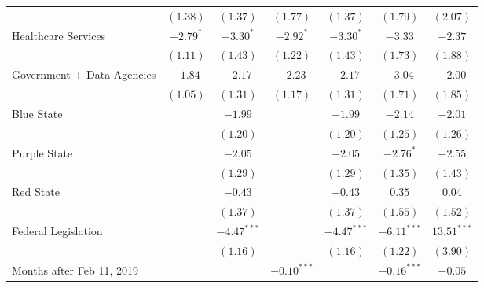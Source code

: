 \begin{table}
\begin{center}
\begin{tabular}{l c c c c c c}
                                                  & $(1.38)$     & $(1.37)$      & $(1.77)$      & $(1.37)$      & $(1.79)$      & $(2.07)$      \\
Healthcare Services                             & $-2.79^{*}$  & $-3.30^{*}$   & $-2.92^{*}$   & $-3.30^{*}$   & $-3.33$       & $-2.37$       \\
                                                  & $(1.11)$     & $(1.43)$      & $(1.22)$      & $(1.43)$      & $(1.73)$      & $(1.88)$      \\
Government + Data Agencies                      & $-1.84$      & $-2.17$       & $-2.23$       & $-2.17$       & $-3.04$       & $-2.00$       \\
                                                  & $(1.05)$     & $(1.31)$      & $(1.17)$      & $(1.31)$      & $(1.71)$      & $(1.85)$      \\
Blue State                                      &              & $-1.99$       &               & $-1.99$       & $-2.14$       & $-2.01$       \\
                                                  &              & $(1.20)$      &               & $(1.20)$      & $(1.25)$      & $(1.26)$      \\
Purple State                                    &              & $-2.05$       &               & $-2.05$       & $-2.76^{*}$   & $-2.55$       \\
                                                  &              & $(1.29)$      &               & $(1.29)$      & $(1.35)$      & $(1.43)$      \\
Red State                                       &              & $-0.43$       &               & $-0.43$       & $0.35$        & $0.04$        \\
                                                  &              & $(1.37)$      &               & $(1.37)$      & $(1.55)$      & $(1.52)$      \\
Federal Legislation                             &              & $-4.47^{***}$ &               & $-4.47^{***}$ & $-6.11^{***}$ & $13.51^{***}$ \\
                                                  &              & $(1.16)$      &               & $(1.16)$      & $(1.22)$      & $(3.90)$      \\
Months after Feb 11, 2019                       &              &               & $-0.10^{***}$ &               & $-0.16^{***}$ & $-0.05$       \\

\end{tabular}
\end{center}
\end{table}
